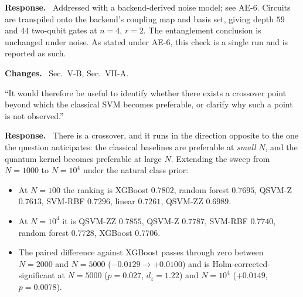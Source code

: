 \documentclass[11pt,a4paper]{article}
\newenvironment{revcomment}
  {\par\addvspace{6pt}\begingroup
   \color{quotegray}\itshape\small
   \begin{list}{}{%
     \setlength{\leftmargin}{1.8em}\setlength{\rightmargin}{1.0em}%
     \setlength{\topsep}{0pt}\setlength{\partopsep}{0pt}%
     \setlength{\parsep}{3pt}\setlength{\itemsep}{0pt}}%
   \item[]}
  {\end{list}\endgroup\normalcolor\addvspace{6pt}}
\newcommand{\itemhead}[2]{%
  \par\addvspace{15pt}%
  \noindent{\bfseries\color{tagink}#1}\hspace{0.7em}{\bfseries #2}%
  \par\addvspace{3.5pt}%
  \noindent{\color{rulegray}\rule{\linewidth}{0.5pt}}%
  \par\addvspace{5pt}%
  \nobreak}
\newcommand{\resp}{\par\addvspace{2pt}\noindent\textbf{Response.}\ }
\newcommand{\changed}{\par\addvspace{5pt}\noindent
  {\bfseries\color{tagink}Changes.}\ }
\begin{document}
\itemhead{R1-6}{NISQ evidence covers only finite-shot error}
\resp
Addressed with a backend-derived noise model; see AE-6. Circuits are transpiled
onto the backend's coupling map and basis set, giving depth $59$ and $44$
two-qubit gates at $n=4$, $r=2$. The entanglement conclusion is unchanged under
noise. As stated under AE-6, this check is a single run and is reported as such.
\changed
Sec.~V-B, Sec.~VII-A.

\itemhead{R1-7}{Is there a crossover point beyond which the classical SVM
becomes preferable?}
\begin{revcomment}
``It would therefore be useful to identify whether there exists a crossover
point beyond which the classical SVM becomes preferable, or clarify why such a
point is not observed.''
\end{revcomment}
\resp
There is a crossover, and it runs in the direction opposite to the one the
question anticipates: the classical baselines are preferable at \emph{small}
$N$, and the quantum kernel becomes preferable at large $N$. Extending the sweep
from $N=1000$ to $N=10^{4}$ under the natural class prior:

\begin{itemize}[leftmargin=1.3em,itemsep=1pt,topsep=3pt]
  \item At $N=100$ the ranking is XGBoost $0.7802$, random forest $0.7695$,
    QSVM-Z $0.7613$, SVM-RBF $0.7296$, linear $0.7261$, QSVM-ZZ $0.6989$.
  \item At $N=10^{4}$ it is QSVM-ZZ $0.7855$, QSVM-Z $0.7787$, SVM-RBF $0.7740$,
    random forest $0.7728$, XGBoost $0.7706$.
  \item The paired difference against XGBoost passes through zero between
    $N=2000$ and $N=5000$ ($-0.0129 \rightarrow +0.0100$) and is
    Holm-corrected-significant at $N=5000$ ($p=0.027$, $d_z=1.22$) and $N=10^{4}$
    ($+0.0149$, $p=0.0078$).
\end{itemize}
\end{document}
